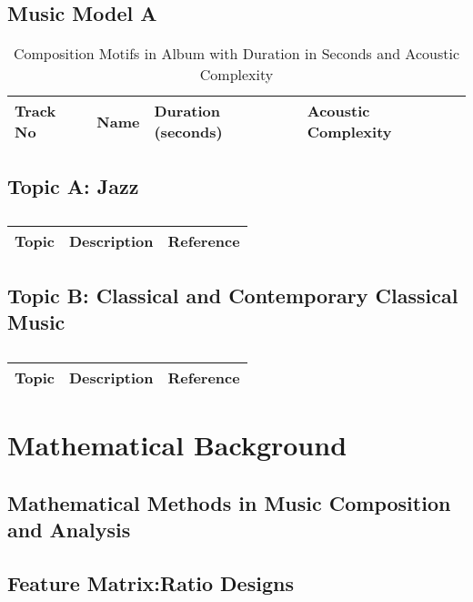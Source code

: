 \subsection{Music Model A}

\begin{table}[H]
	\caption{Composition Motifs in Album with Duration in Seconds and Acoustic Complexity}	
	\begin{tabular}{p{1cm}p{4cm}p{2cm}p{2cm}}
	\hline
	Track No & Name & Duration (seconds) & Acoustic Complexity\\
	\hline
	\hline 
	\end{tabular}
\end{table}

\subsection{Topic A: Jazz}

\centering	
\begin{table}[H]\tiny
	\caption{}	
	\begin{tabular}{r|p{4cm}|l}
		\hline	
		Topic & Description & Reference \\
		\hline 
		\hline 
	\end{tabular}
\end{table}

\subsection{Topic B: Classical and Contemporary Classical Music}

\centering	
\begin{table}[H]\tiny
	\caption{}	
	\begin{tabular}{r|p{4cm}|l}
		\hline	
		Topic & Description & Reference \\
		\hline 
		\hline 
	\end{tabular}
\end{table}

\section{Mathematical Background}

\subsection{Mathematical Methods in Music Composition and Analysis}

\subsection{Feature Matrix:Ratio Designs}

